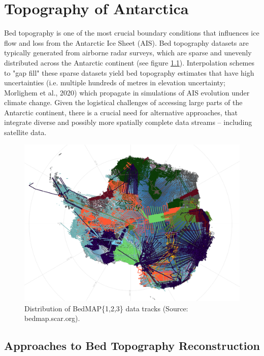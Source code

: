 \chapter{Topography of Antarctica}\label{review}

Bed topography is one of the most crucial boundary conditions that influences ice flow and loss from the Antarctic Ice Sheet (AIS)\cite{Morlighem_2020}. Bed topography datasets are typically generated from airborne radar surveys, which are sparse and unevenly distributed across the Antarctic continent (see figure \ref{fig:BedMAP}). Interpolation schemes to "gap fill" these sparse datasets yield bed topography estimates that have high uncertainties (i.e. multiple hundreds of metres in elevation uncertainty; Morlighem et al., 2020) which propagate in simulations of AIS evolution under climate change\cite{Castleman_2022}. Given the logistical challenges of accessing large parts of the Antarctic continent, there is a crucial need for alternative approaches, that integrate diverse and possibly more spatially complete data streams – including satellite data.
\begin{figure}[H] %
    \includegraphics[scale=0.4]{bedmap.png}
    \caption{Distribution of BedMAP\{1,2,3\} data tracks (Source: bedmap.scar.org).}
    \label{fig:BedMAP}
\end{figure}

\section{Approaches to Bed Topography Reconstruction}

